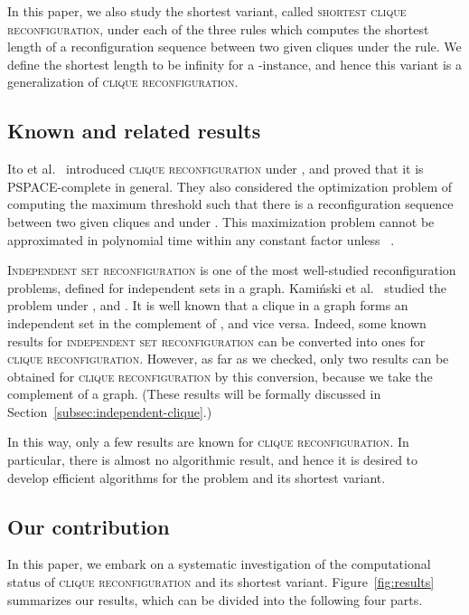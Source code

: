 \documentclass{llncs}
\newcounter{one}
\newcounter{two}
\newcounter{three}
\newcounter{four}
\begin{document}
	In this paper, we also study the shortest variant, called \textsc{shortest clique reconfiguration}, under each of the three rules which computes the shortest length of a reconfiguration sequence between two given cliques under the rule.
	We define the shortest length to be infinity for a -instance, and hence this variant is a generalization of \textsc{clique reconfiguration}. 

\subsection{Known and related results}
	
	Ito et al.~\cite{IDHPSUU} introduced \textsc{clique reconfiguration} under , and proved that it is PSPACE-complete in general. 
	They also considered the optimization problem of computing the maximum threshold  such that there is a reconfiguration sequence between two given cliques  and  under . 
	This maximization problem cannot be approximated in polynomial time within any constant factor unless ~\cite{IDHPSUU}.

	\textsc{Independent set reconfiguration} is one of the most well-studied reconfiguration problems, defined for independent sets in a graph. 
	Kami\'nski et al.~\cite{KaminskiMM12} studied the problem under ,  and . 
	It is well known that a clique in a graph  forms an independent set in the complement  of , and vice versa.
	Indeed, some known results for \textsc{independent set reconfiguration} can be converted into ones for \textsc{clique reconfiguration}.
However, as far as we checked, only two results can be obtained for \textsc{clique reconfiguration} by this conversion, because we take the complement of a graph.
(These results will be formally discussed in Section~\ref{subsec:independent-clique}.)

	In this way, only a few results are known for \textsc{clique reconfiguration}. 
	In particular, there is almost no algorithmic result, and hence it is desired to develop efficient algorithms for the problem and its shortest variant. 

\subsection{Our contribution}

	In this paper, we embark on a systematic investigation of the computational status of \textsc{clique reconfiguration} and its shortest variant. 
	Figure~\ref{fig:results} summarizes our results, which can be divided into the following four parts.
\smallskip
\end{document}
